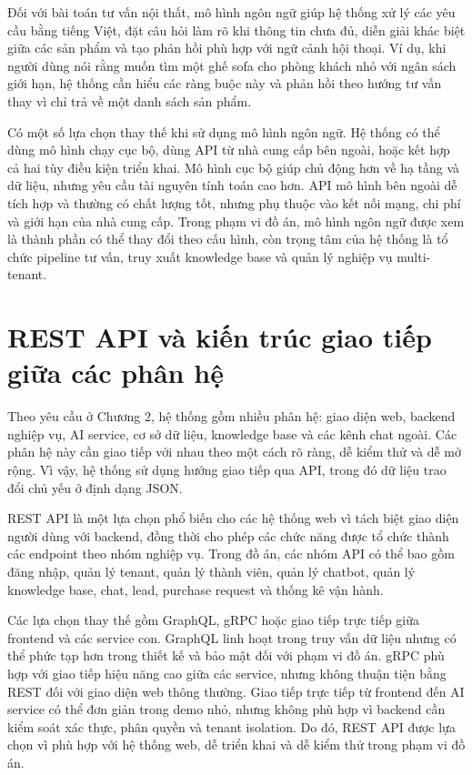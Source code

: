 \documentclass[../DoAn.tex]{subfiles}
\begin{document}
Đối với bài toán tư vấn nội thất, mô hình ngôn ngữ giúp hệ thống xử lý các yêu cầu bằng tiếng Việt, đặt câu hỏi làm rõ khi thông tin chưa đủ, diễn giải khác biệt giữa các sản phẩm và tạo phản hồi phù hợp với ngữ cảnh hội thoại. Ví dụ, khi người dùng nói rằng muốn tìm một ghế sofa cho phòng khách nhỏ với ngân sách giới hạn, hệ thống cần hiểu các ràng buộc này và phản hồi theo hướng tư vấn thay vì chỉ trả về một danh sách sản phẩm.

Có một số lựa chọn thay thế khi sử dụng mô hình ngôn ngữ. Hệ thống có thể dùng mô hình chạy cục bộ, dùng API từ nhà cung cấp bên ngoài, hoặc kết hợp cả hai tùy điều kiện triển khai. Mô hình cục bộ giúp chủ động hơn về hạ tầng và dữ liệu, nhưng yêu cầu tài nguyên tính toán cao hơn. API mô hình bên ngoài dễ tích hợp và thường có chất lượng tốt, nhưng phụ thuộc vào kết nối mạng, chi phí và giới hạn của nhà cung cấp. Trong phạm vi đồ án, mô hình ngôn ngữ được xem là thành phần có thể thay đổi theo cấu hình, còn trọng tâm của hệ thống là tổ chức pipeline tư vấn, truy xuất knowledge base và quản lý nghiệp vụ multi-tenant.

\section{REST API và kiến trúc giao tiếp giữa các phân hệ}
\label{section:3.5}

Theo yêu cầu ở Chương 2, hệ thống gồm nhiều phân hệ: giao diện web, backend nghiệp vụ, AI service, cơ sở dữ liệu, knowledge base và các kênh chat ngoài. Các phân hệ này cần giao tiếp với nhau theo một cách rõ ràng, dễ kiểm thử và dễ mở rộng. Vì vậy, hệ thống sử dụng hướng giao tiếp qua API, trong đó dữ liệu trao đổi chủ yếu ở định dạng JSON.

REST API là một lựa chọn phổ biến cho các hệ thống web vì tách biệt giao diện người dùng với backend, đồng thời cho phép các chức năng được tổ chức thành các endpoint theo nhóm nghiệp vụ. Trong đồ án, các nhóm API có thể bao gồm đăng nhập, quản lý tenant, quản lý thành viên, quản lý chatbot, quản lý knowledge base, chat, lead, purchase request và thống kê vận hành.

Các lựa chọn thay thế gồm GraphQL, gRPC hoặc giao tiếp trực tiếp giữa frontend và các service con. GraphQL linh hoạt trong truy vấn dữ liệu nhưng có thể phức tạp hơn trong thiết kế và bảo mật đối với phạm vi đồ án. gRPC phù hợp với giao tiếp hiệu năng cao giữa các service, nhưng không thuận tiện bằng REST đối với giao diện web thông thường. Giao tiếp trực tiếp từ frontend đến AI service có thể đơn giản trong demo nhỏ, nhưng không phù hợp vì backend cần kiểm soát xác thực, phân quyền và tenant isolation. Do đó, REST API được lựa chọn vì phù hợp với hệ thống web, dễ triển khai và dễ kiểm thử trong phạm vi đồ án.
\end{document}
